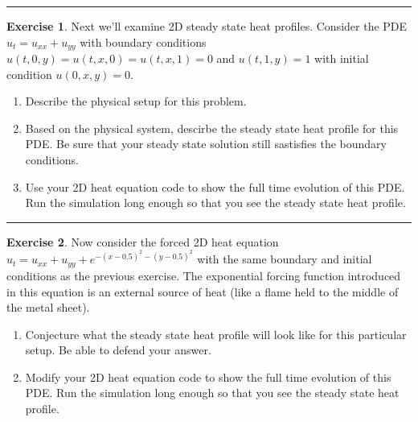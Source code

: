 \documentclass[
]{book}
\providecommand{\tightlist}{%
  \setlength{\itemsep}{0pt}\setlength{\parskip}{0pt}}
\theoremstyle{definition}
\theoremstyle{definition}
\theoremstyle{definition}
\newtheorem{exercise}{Exercise}[chapter]
\theoremstyle{remark}
\begin{document}
\begin{center}\rule{0.5\linewidth}{0.5pt}\end{center}

\begin{exercise}
\protect\hypertarget{exr:unnamed-chunk-596}{}{\label{exr:unnamed-chunk-596} }Next we'll examine 2D steady state heat profiles. Consider the PDE \(u_t = u_{xx} + u_{yy}\) with boundary conditions \(u(t,0,y) = u(t,x,0) = u(t,x,1) = 0\) and \(u(t,1,y) = 1\) with initial condition \(u(0,x,y) = 0\).

\begin{enumerate}
\def\labelenumi{\alph{enumi}.}
\tightlist
\item
  Describe the physical setup for this problem.
\item
  Based on the physical system, descirbe the steady state heat profile for this PDE. Be sure that your steady state solution still sastisfies the boundary conditions.
\item
  Use your 2D heat equation code to show the full time evolution of this PDE. Run the simulation long enough so that you see the steady state heat profile.
\end{enumerate}
\end{exercise}

\begin{center}\rule{0.5\linewidth}{0.5pt}\end{center}

\begin{exercise}
\protect\hypertarget{exr:unnamed-chunk-597}{}{\label{exr:unnamed-chunk-597} }Now consider the forced 2D heat equation \(u_t = u_{xx} + u_{yy} + e^{-(x-0.5)^2-(y-0.5)^2}\) with the same boundary and initial conditions as the previous exercise. The exponential forcing function introduced in this equation is an external source of heat (like a flame held to the middle of the metal sheet).

\begin{enumerate}
\def\labelenumi{\alph{enumi}.}
\tightlist
\item
  Conjecture what the steady state heat profile will look like for this particular setup. Be able to defend your answer.
\item
  Modify your 2D heat equation code to show the full time evolution of this PDE. Run the simulation long enough so that you see the steady state heat profile.
\end{enumerate}
\end{exercise}
\end{document}
